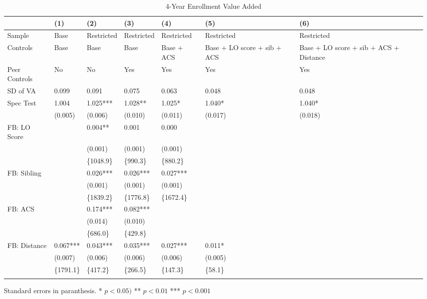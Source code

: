 \begin{table}[tbp] \centering
{}

\caption{4-Year Enrollment Value Added}
{\footnotesize
\begin{tabularx}{\linewidth}{lCCCCCC}

\toprule
&{(1)}&{(2)}&{(3)}&{(4)}&{(5)}&{(6)} \tabularnewline
\midrule \addlinespace[\belowrulesep]
Sample&Base&Restricted&Restricted&Restricted&Restricted&Restricted \tabularnewline
Controls&Base&Base&Base&Base + ACS&Base + LO score + sib + ACS&Base + LO score + sib + ACS + Distance \tabularnewline
Peer Controls&No&No&Yes&Yes&Yes&Yes \tabularnewline
\midrule SD of VA&0.099&0.091&0.075&0.063&0.048&0.048 \tabularnewline
Spec Test&1.004&1.025***&1.028**&1.025*&1.040*&1.040* \tabularnewline
&(0.005)&(0.006)&(0.010)&(0.011)&(0.017)&(0.018) \tabularnewline
FB: LO Score&&0.004**&0.001&0.000&& \tabularnewline
&&(0.001)&(0.001)&(0.001)&& \tabularnewline
&&\{1048.9\}&\{990.3\}&\{880.2\}&& \tabularnewline
FB: Sibling&&0.026***&0.026***&0.027***&& \tabularnewline
&&(0.001)&(0.001)&(0.001)&& \tabularnewline
&&\{1839.2\}&\{1776.8\}&\{1672.4\}&& \tabularnewline
FB: ACS&&0.174***&0.082***&&& \tabularnewline
&&(0.014)&(0.010)&&& \tabularnewline
&&\{686.0\}&\{429.8\}&&& \tabularnewline
FB: Distance&0.067***&0.043***&0.035***&0.027***&0.011*& \tabularnewline
&(0.007)&(0.006)&(0.006)&(0.006)&(0.005)& \tabularnewline
&\{1791.1\}&\{417.2\}&\{266.5\}&\{147.3\}&\{58.1\}& \tabularnewline
\bottomrule \addlinespace[\belowrulesep]

\end{tabularx}
\begin{flushleft}
\footnotesize Standard errors in paranthesis. * \(p<0.05)\) ** \(p<0.01\) *** \(p<0.001\)
\end{flushleft}
}
\end{table}
